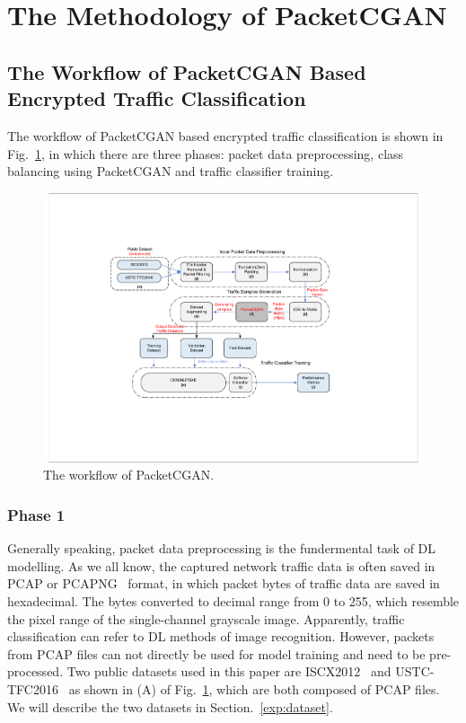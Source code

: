 \documentclass[conference]{IEEEtran}
\begin{document}
\fi

\section{The Methodology of PacketCGAN}\label{algorithm}
\subsection{The Workflow of PacketCGAN Based Encrypted Traffic Classification}
The workflow of PacketCGAN based encrypted traffic classification is shown in Fig.~\ref{fig:workflow}, in which there are three phases: packet data preprocessing, class balancing using PacketCGAN and traffic classifier training. 


\begin{figure}[ht!]
	\centering\includegraphics[width=3.3 in]{fig/PacketCGAN-WorkFlow-ICC2020.pdf} 
	\caption{The workflow of PacketCGAN.}\label{fig:workflow} %
\end{figure}

\subsubsection{Phase 1}\label{data_preprocess}
Generally speaking, packet data preprocessing is the fundermental task of DL modelling. As we all know, the captured network traffic data is often saved in PCAP or PCAPNG~\cite{pcap} format, in which  packet bytes of traffic data are saved in hexadecimal. The bytes converted to decimal range from 0 to 255, which resemble the pixel range of the single-channel grayscale image. Apparently, traffic classification can refer to DL methods of image recognition. However, packets from PCAP files can not directly be used for model training and need to be pre-processed. Two public datasets used in this paper are ISCX2012~\cite{ISCX} and USTC-TFC2016~\cite{Wang2D-CNN} as shown in (A) of Fig.~\ref{fig:workflow}, which are both composed of PCAP files. We will describe the two datasets in Section.~\ref{exp:dataset}.
\end{document}
